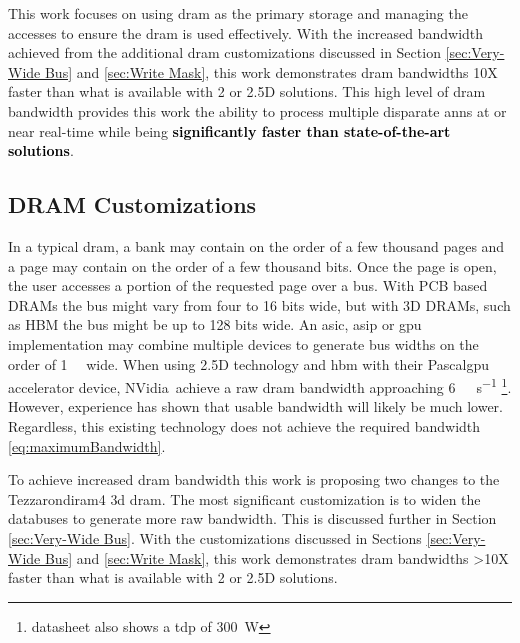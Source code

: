 This work focuses on using \ac{dram} as the primary storage and managing the accesses to ensure the \ac{dram} is used effectively. 
With the increased bandwidth achieved from the additional \ac{dram} customizations discussed in Section \ref{sec:Very-Wide Bus} and \ref{sec:Write Mask}, this work demonstrates \ac{dram} bandwidths 10X faster than what is available with 2 or 2.5D solutions.
This high level of \ac{dram} bandwidth provides this work the ability to process multiple disparate \acp{ann} at or near real-time while being \textbf{\textcolor{black}{significantly faster than state-of-the-art solutions}}.


\subsection{DRAM Customizations}

In a typical \ac{dram}, a bank may contain on the order of a few thousand pages and a page may contain on the order of a few thousand bits.
Once the page is open, the user accesses a portion of the requested page over a bus. With PCB based DRAMs the bus might vary from four to 16 bits wide, but with 3D DRAMs, such as HBM the bus might be up to 128 bits wide.
An \ac{asic}, \ac{asip} or \ac{gpu} implementation may combine multiple devices to generate bus widths on the order of \SI[per-mode=symbol]{1}{\kilo \bit} wide. 
When using 2.5D technology and \ac{hbm} with their Pascal\texttrademark \ac{gpu} accelerator device, NVidia\textregistered ~achieve a raw \ac{dram} bandwidth approaching \SI[per-mode=symbol]{6}{\tera \bit \per \second} \cite{Nvidia_p100_summary_datasheet}\footnote{datasheet also shows a \ac{tdp} of \SI[per-mode=symbol]{300}{\watt}}.
However, experience has shown \cite{farabet2011neuflow} \cite{jouppi2017datacenter} that usable bandwidth will likely be much lower.
Regardless, this existing technology does not achieve the required bandwidth \eqref{eq:maximumBandwidth}.



To achieve increased \ac{dram} bandwidth this work is proposing two changes to the Tezzaron\textregistered \ac{diram4} \cite{tezzaron:diram4} \ac{3d} \ac{dram}. 
The most significant customization is to widen the databuses to generate more raw bandwidth. This is discussed further in Section \ref{sec:Very-Wide Bus}.
With the customizations discussed in Sections \ref{sec:Very-Wide Bus} and \ref{sec:Write Mask}, this work demonstrates \ac{dram} bandwidths >10X faster than what is available with 2 or 2.5D solutions.

